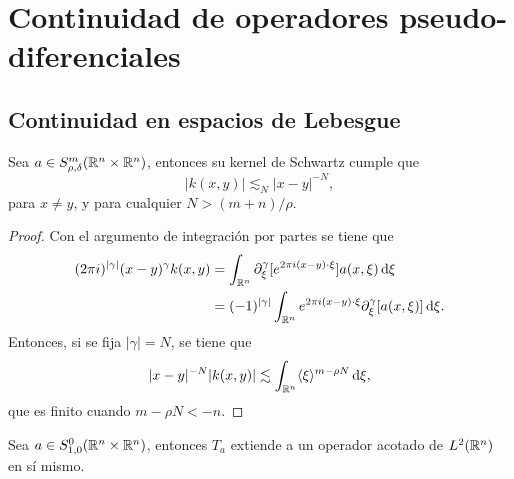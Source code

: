 \chapter{Continuidad de operadores pseudo-diferenciales}

\section{Continuidad en espacios de Lebesgue}
\begin{theorem}\label{theo:kernel-estimates}
	Sea $a\in S^m_{\rho,\delta}(\mathbb{R}^n\times\mathbb{R}^n)$, entonces su kernel de Schwartz cumple que 
	\begin{equation*}
		|k(x, y)| \lesssim_N |x-y|^{-N},
	\end{equation*}
	para $x\neq y$, y para cualquier $N>(m+n)/\rho$. 
\end{theorem}
\begin{proof}
	Con el argumento de integración por partes se tiene que 
	\begin{align*}
		(2\pi i)^{|\gamma|} (x-y)^\gamma k(x, y) & = 
		\int_{\mathbb{R}^n} \partial^\gamma_\xi [e^{2\pi i (x-y)\cdot\xi}]a(x, \xi) \mathop{}\!\mathrm{d} \xi \\
		& = (-1)^{|\gamma|} \int_{\mathbb{R}^n} e^{2\pi i (x-y)\cdot\xi} \partial^\gamma_\xi [a(x, \xi)] \mathop{}\!\mathrm{d} \xi.
	\end{align*}
	Entonces, si se fija $|\gamma|=N$, se tiene que 
	\begin{equation*}
		|x-y|^{-N}|k(x, y)| \lesssim \int_{\mathbb{R}^n} \langle\xi\rangle^{m-\rho N} \mathop{}\!\mathrm{d} \xi,
	\end{equation*}
	que es finito cuando $m-\rho N < -n$.
\end{proof}
\begin{theorem}\label{theo:L2-boundedness-S0}
	Sea $a\in S^0_{1,0}(\mathbb{R}^n\times\mathbb{R}^n)$, entonces $T_a$ extiende a un operador acotado de $L^2(\mathbb{R}^n)$ en sí mismo.
\end{theorem}
